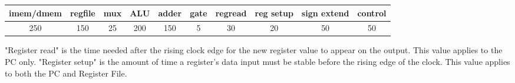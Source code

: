 \documentclass{article}
\begin{document}
    \begin{table}[ht]
        \centering
        \resizebox{\textwidth}{!}
        {\begin{tabular}{cccccccccc}
            \hline
            imem/dmem & regfile & mux & ALU & adder & gate & regread & reg setup & sign extend & control\\
            \hline
            250 & 150 & 25 & 200 & 150 & 5 & 30 & 20 & 50 & 50\\
            \hline
        \end{tabular}}
    \end{table}

    "Register read" is the time needed after the rising clock edge for the new register value to appear on the output. This value applies to the PC only. "Register setup" is the amount of time a register's data input must be stable before the rising edge of the clock. This value applies to both the PC and Register File.
\end{document}
